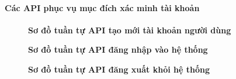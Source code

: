 \paragraph{Các API phục vụ mục đích xác minh tài khoản}
\mbox{}

\begin{figure}[H]
	\centering
	\caption[Sơ đồ tuần tự API tạo mới tài khoản người dùng]{\bfseries \fontsize{12pt}{0pt}\selectfont Sơ đồ tuần tự API tạo mới tài khoản người dùng}
	\label{sequence_diagram_create_account}
\end{figure}

\begin{figure}[H]
	\centering
	\caption[Sơ đồ tuần tự API đăng nhập vào hệ thống]{\bfseries \fontsize{12pt}{0pt}\selectfont Sơ đồ tuần tự API đăng nhập vào hệ thống}
	\label{sequence_diagram_login}
\end{figure}

\begin{figure}[H]
	\centering
	\caption[Sơ đồ tuần tự API đăng xuất khỏi hệ thống]{\bfseries \fontsize{12pt}{0pt}\selectfont Sơ đồ tuần tự API đăng xuất khỏi hệ thống}
	\label{sequence_diagram_logout}
\end{figure}

